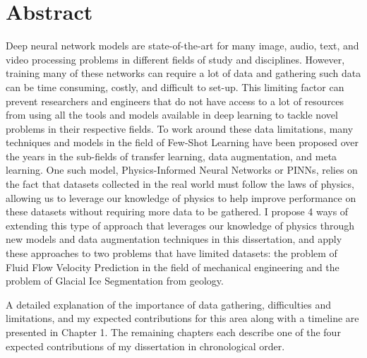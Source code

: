 

\chapter*{Abstract}
Deep neural network models are state-of-the-art for many image, audio, text, and video processing problems in different fields of study and disciplines. However, training many of these networks can require a lot of data and gathering such data can be time consuming, costly, and difficult to set-up.  This limiting factor can prevent researchers and engineers that do not have access to a lot of resources from using all the tools and models available in deep learning to tackle novel problems in their respective fields. To work around these data limitations, many techniques and models in the field of Few-Shot Learning have been proposed over the years in the sub-fields of transfer learning, data augmentation, and meta learning. One such model, Physics-Informed Neural Networks or PINNs, relies on the fact that datasets collected in the real world must follow the laws of physics, allowing us to leverage our knowledge of physics to help improve performance on these datasets without requiring more data to be gathered. I propose 4 ways of extending this type of approach that leverages our knowledge of physics through new models and data augmentation techniques in this dissertation, and apply these approaches to two problems that have limited datasets: the problem of Fluid Flow Velocity Prediction in the field of mechanical engineering and the problem of Glacial Ice Segmentation from geology. 

A detailed explanation of the importance of data gathering, difficulties and limitations, and my expected contributions for this area along with a timeline are presented in Chapter 1. The remaining chapters each describe one of the four expected contributions of my dissertation in chronological order.